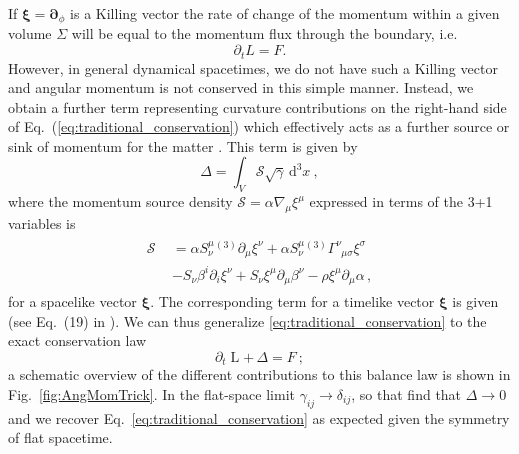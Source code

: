 \documentclass[aps,twocolumn,nofootinbib,superscriptaddress,amsfonts,floatfix
]{revtex4-1} %
\newcommand{\dd}{\mathrm{d}}
\newcommand{\bs}{\boldsymbol}
\begin{document}
If $\bs{\xi} = \bs{\partial}_\phi$ is a Killing vector the rate of change of the momentum
within a given volume $\Sigma$ will be equal to the momentum flux through the
boundary, i.e.
\begin{equation} \label{eq:traditional_conservation}
    \partial_t {L} = {F}.
\end{equation}
However, in general dynamical spacetimes, we do not have such
a Killing vector and angular momentum is not conserved in this simple manner. 
Instead, we obtain a further term representing curvature contributions on the right-hand side of Eq.~(\ref{eq:traditional_conservation})
which effectively acts as a further source or sink of momentum for the matter \cite{Croft:2022gks,Clough:2021qlv}. This term is given by
\begin{equation}
    \mathbin{{\Delta = \int_{V} \mathcal{S} \sqrt{\gamma }\,
    \dd^3x}}~,
\end{equation}
where the momentum source density $\mathcal{S}=\alpha\nabla_{\mu}\xi^{\mu}$ expressed in terms
of the 3+1 variables is
\begin{align}
    \begin{split}\mathcal{S} &= \alpha S^\mu_{\nu}{}^{(3)}\partial_\mu \xi^\nu + \alpha S^\mu_{\nu} {}^{(3)}\Gamma^\nu_{\,\,\,\mu \sigma} \xi^\sigma \\ \quad &- S_\nu \beta^i \partial_i \xi^\nu  + S_\nu \xi^\mu \partial_\mu \beta^\nu - \rho \xi^\mu \partial_\mu \alpha\,, \end{split}
\end{align}
for a spacelike vector $\bs\xi$. The corresponding term
for a timelike vector $\bs\xi$ is given (see Eq.~(19) in \cite{Clough:2021qlv}).
We can thus generalize \cref{eq:traditional_conservation} to the exact conservation law
\begin{equation}
    \partial_t\mathbin{{L}} +\,
    \mathbin{{\Delta}} =
    \mathbin{F}~;\label{eqn:conserved_ang}
\end{equation} 
a schematic overview of the different contributions to this balance
law is shown in Fig.~\ref{fig:AngMomTrick}. In the flat-space limit $\gamma_{ij}
\rightarrow \delta_{ij}$, so that
find that ${{\Delta}}\rightarrow 0$ and we recover Eq.~\ref{eq:traditional_conservation} as expected given the
symmetry of flat spacetime.
\end{document}

